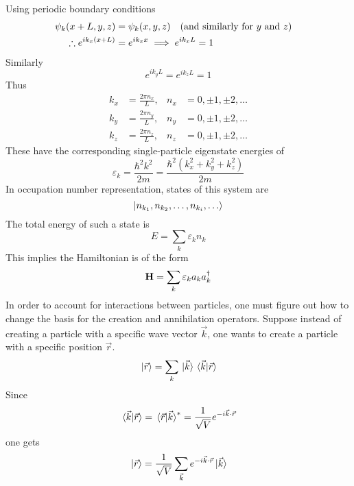 \documentclass[12pt,a4paper,titlepage]{article}
\begin{document}
Using periodic boundary conditions
\begin{equation}
\begin{aligned}
\psi_{k}(x+L,y,z)&=\psi_{k}(x,y,z)\qq{(and similarly for $y$ and $z$)}\\
\therefore e^{ik_{x}(x+L)}&=e^{ik_{x}x}\implies e^{ik_{x}L}=1
\end{aligned}
\end{equation}
Similarly
\begin{equation}
e^{ik_{y}L}=e^{ik_{z}L}=1
\end{equation}
Thus
\begin{equation}
\begin{aligned}
k_{x}&=\frac{2\pi n_{x}}{L}, &n_{x}&=0,\pm1,\pm2,\ldots\\
k_{y}&=\frac{2\pi n_{y}}{L}, &n_{y}&=0,\pm1,\pm2,\ldots\\
k_{z}&=\frac{2\pi n_{z}}{L}, &n_{z}&=0,\pm1,\pm2,\ldots
\end{aligned}
\end{equation}
These have the corresponding single-particle eigenstate energies of
\begin{equation}
\varepsilon_{k}=\frac{\hbar^{2}k^{2}}{2m}=\frac{\hbar^{2}(k_{x}^{2}+k_{y}^{2}+k_{z}^{2})}{2m}
\end{equation}
In occupation number representation, states of this system are
\[
\ket{n_{k_{1}},n_{k_{2}},\ldots,n_{k_{i}},\ldots}
\]
The total energy of such a state is
\begin{equation}
E=\sum_{k}\varepsilon_{k}n_{k}
\end{equation}
This implies the Hamiltonian is of the form
\begin{equation}
\vb{H}=\sum_{k}\varepsilon_{k}a_{k}a_{k}^{\dagger}
\end{equation}
In order to account for interactions between particles, one must figure out how to change the basis for the creation and annihilation operators. Suppose instead of creating a particle with a specific wave vector $\vec{k}$, one wants to create a particle with a specific position $\vec{r}$.
\begin{equation}
\ket*{\vec{r}}=\sum_{k}\ket*{\vec{k}}\ip*{\vec{k}}{\vec{r}}
\end{equation}
Since
\begin{equation}
\ip*{\vec{k}}{\vec{r}}=\ip*{\vec{r}}{\vec{k}}^{*}=\frac{1}{\sqrt{V}}e^{-i\vec{k}\cdot\vec{r}}
\end{equation}
one gets
\begin{equation}
\ket*{\vec{r}}=\frac{1}{\sqrt{V}}\sum_{\vec{k}}e^{-i\vec{k}\cdot\vec{r}}\ket*{\vec{k}}
\end{equation}
\end{document}
